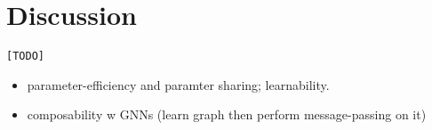 
\section{Discussion}\label{sec:discussion}

\texttt{[TODO]}

\begin{itemize}
    \item parameter-efficiency and paramter sharing; learnability.
    \item composability w GNNs (learn graph then perform message-passing on it)
\end{itemize}